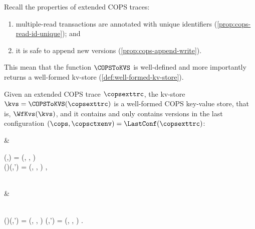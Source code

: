 

Recall the properties of extended COPS traces:
\begin{enumerate}
\item multiple-read transactions are annotated with unique identifiers (\cref{prop:cops-read-id-unique});
and \item it is safe to append new versions (\cref{prop:cops-append-write}).
\end{enumerate}
This mean that the function \( \COPSToKVS \) is well-defined and more importantly 
returns a well-formed kv-store (\cref{def:well-formed-kv-store}).

\begin{proposition}
Given an extended COPS trace \( \copsexttrc \),
the kv-store \( \kvs = \COPSToKVS(\copsexttrc) \) is a well-formed COPS key-value store,
that is, \( \WfKvs(\kvs) \),
and it contains and only contains versions 
in the last configuration \( (\cops,\copsctxenv) = \LastConf(\copsexttrc) \):
\begin{Formulae}
& \begin{Formula}
    \Forall{\key \in \Keys | \idx \in \Indexs | \val \in \Values | \copstxid \in \COPSTxIDs }
    \kvs(\key,\idx) = (\val, \copstxid, \stub )
    \\ \implies 
    \cops(\repl)(\key,\idx') = (\val, \copstxid, \stub ) ,
    \label{equ:versions-in-merged-cops-to-replicas}
\end{Formula}
\\ & \begin{Formula}
    \Forall{\key \in \Keys | \idx \in \Indexs | \val \in \Values | \copstxid \in \COPSTxIDs }
    \\ \Forall{ \repl \in \COPSReplicas}
    \cops(\repl)(\key,\idx') = (\val, \copstxid, \stub ) 
    \implies 
    \kvs(\key,\idx') = (\val, \copstxid, \stub ) .
    \label{equ:versions-in-replicas-to-merged-cops}
\end{Formula}
\end{Formulae}
\end{proposition}
